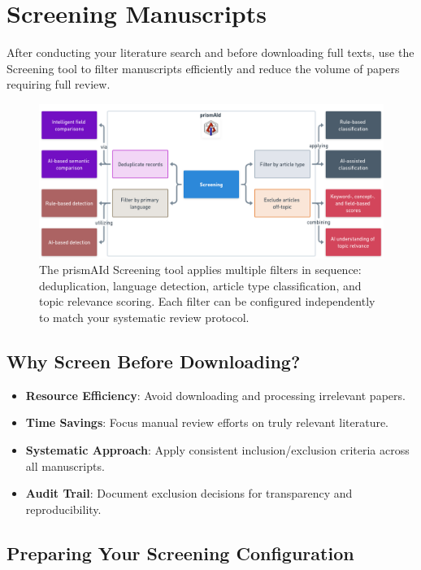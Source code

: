 \section{Screening Manuscripts}

After conducting your literature search and before downloading full texts, use the Screening tool to filter manuscripts efficiently and reduce the volume of papers requiring full review.

\begin{figure}[h]
    \centering
    \includegraphics[width=\textwidth]{figures/screening_tools.png}
    \caption{The prismAId Screening tool applies multiple filters in sequence: deduplication, language detection, article type classification, and topic relevance scoring. Each filter can be configured independently to match your systematic review protocol.}
    \label{fig:screening_tools}
\end{figure}

\subsection{Why Screen Before Downloading?}

\begin{itemize}
    \item \textbf{Resource Efficiency}: Avoid downloading and processing irrelevant papers.
    \item \textbf{Time Savings}: Focus manual review efforts on truly relevant literature.
    \item \textbf{Systematic Approach}: Apply consistent inclusion/exclusion criteria across all manuscripts.
    \item \textbf{Audit Trail}: Document exclusion decisions for transparency and reproducibility.
\end{itemize}

\subsection{Preparing Your Screening Configuration}

